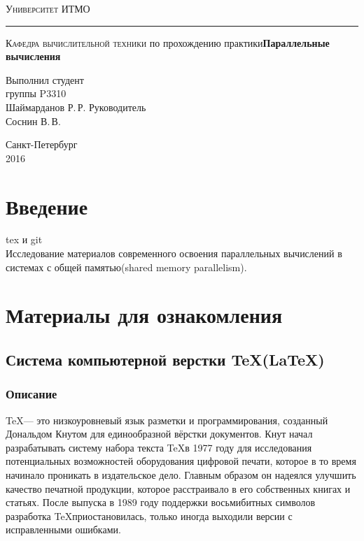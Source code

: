 \documentclass{article}
\author{Шаймарданов Р. Р.}
\begin{document}
\begin{titlepage}
	\begin{center}
		{\large\textsc{Университет ИТМО}}
		\vskip 1pt \hrule \vskip 3pt
		{\large\textsc{Кафедра вычислительной техники}}
		\vfill
		{ по прохождению практики\vskip 12pt\bfseries Параллельные вычисления}	
	\end{center}
	\vfill	
	\begin{flushright}
		{Выполнил студент\\группы P3310\\Шаймарданов Р.\,Р.\vskip 12pt Руководитель\\Соснин В.\,В.}
	\end{flushright}	
	\vfill	
	\begin{center}
		Санкт-Петербург\\2016
	\end{center}
\end{titlepage}

\tableofcontents
\newpage

\section{Введение}
	tex и git\\
	
	Исследование материалов современного освоения параллельных вычислений в системах с общей памятью(shared memory parallelism).
	
\newpage
\section{Материалы для ознакомления}	
	\subsection{Система компьютерной верстки \TeX(\LaTeX)}
		\subsubsection{Описание}
	\TeX — это низкоуровневый язык разметки и программирования, созданный Дональдом Кнутом для единообразной вёрстки документов. Кнут начал разрабатывать систему набора текста \TeX в 1977 году для исследования потенциальных возможностей оборудования цифровой печати, которое в то время начинало проникать в издательское дело. Главным образом он надеялся улучшить качество печатной продукции, которое расстраивало в его собственных книгах и статьях. После выпуска в 1989 году поддержки восьмибитных символов разработка \TeX приостановилась, только иногда выходили версии с исправленными ошибками.\\
\end{document}
